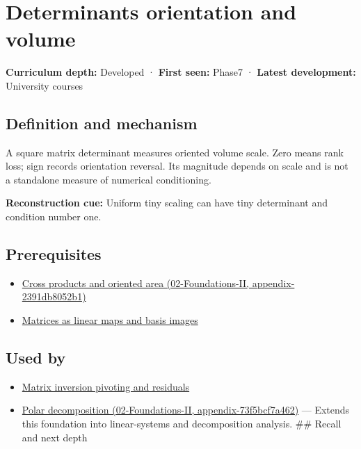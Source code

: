 \hypertarget{appendix-da478be01d02}{}
\section{Determinants orientation and volume}\label{appendix-da478be01d02-determinants-orientation-and-volume}

\textbf{Curriculum depth:} Developed · \textbf{First seen:} Phase7 · \textbf{Latest development:} University courses

\subsection{Definition and mechanism}\label{appendix-da478be01d02-definition-and-mechanism}

A square matrix determinant measures oriented volume scale. Zero means rank loss; sign records orientation reversal. Its magnitude depends on scale and is not a standalone measure of numerical conditioning.

\textbf{Reconstruction cue:} Uniform tiny scaling can have tiny determinant and condition number one.

\subsection{Prerequisites}\label{appendix-da478be01d02-prerequisites}

\begin{itemize}
\tightlist
\item
  \href{../02-Foundations-II/main.pdf\#nameddest=appendix-2391db8052b1}{Cross products and oriented area (02-Foundations-II, appendix-2391db8052b1)}
\item
  \hyperref[appendix-bd39c3bf5d64]{Matrices as linear maps and basis images}
\end{itemize}

\subsection{Used by}\label{appendix-da478be01d02-used-by}

\begin{itemize}
\tightlist
\item
  \hyperref[appendix-48d2e66378ab]{Matrix inversion pivoting and residuals}
\item
  \href{../02-Foundations-II/main.pdf\#nameddest=appendix-73f5bcf7a462}{Polar decomposition (02-Foundations-II, appendix-73f5bcf7a462)} --- Extends this foundation into linear-systems and decomposition analysis. \#\# Recall and next depth
\end{itemize}

